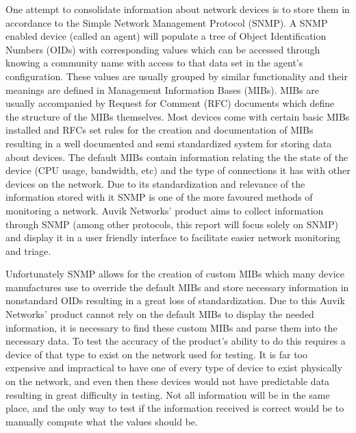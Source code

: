 \documentclass[12pt]{article}
\begin{document}
One attempt to consolidate information about network devices is to store them in accordance to the Simple Network Management Protocol (SNMP). A SNMP enabled device (called an agent) will populate a tree of Object Identification Numbers (OIDs) with corresponding values which can be accessed through knowing a community name with access to that data set in the agent's configuration.  These values are usually grouped by similar functionality and their meanings are defined in Management Information Bases (MIBs). MIBs are usually accompanied by Request for Comment (RFC) documents which define the structure of the MIBs themselves. Most devices come with certain basic MIBs installed and RFCs set rules for the creation and documentation of MIBs resulting in a well documented and semi standardized system for storing data about devices. The default MIBs contain information relating the the state of the device (CPU usage, bandwidth, etc) and the type of connections it has with other devices on the network. Due to its standardization and relevance of the information stored with it SNMP is one of the more favoured methods of monitoring a network. Auvik Networks' product aims to collect information through SNMP (among other protocols, this report will focus solely on SNMP) and display it in a user friendly interface to facilitate easier network monitoring and triage.

Unfortunately SNMP allows for the creation of custom MIBs which many device manufactures use to override the default MIBs and store necessary information in nonstandard OIDs resulting in a great loss of standardization. Due to this Auvik Networks' product cannot rely on the default MIBs to display the needed information, it is necessary to find these custom MIBs and parse them into the necessary data. To test the accuracy of the product's ability to do this requires a device of that type to exist on the network used for testing. It is far too expensive and impractical to have one of every type of device to exist physically on the network, and even then these devices would not have predictable data resulting in great difficulty in testing. Not all information will be in the same place, and the only way to test if the information received is correct would be to manually compute what the values should be.
\end{document}
